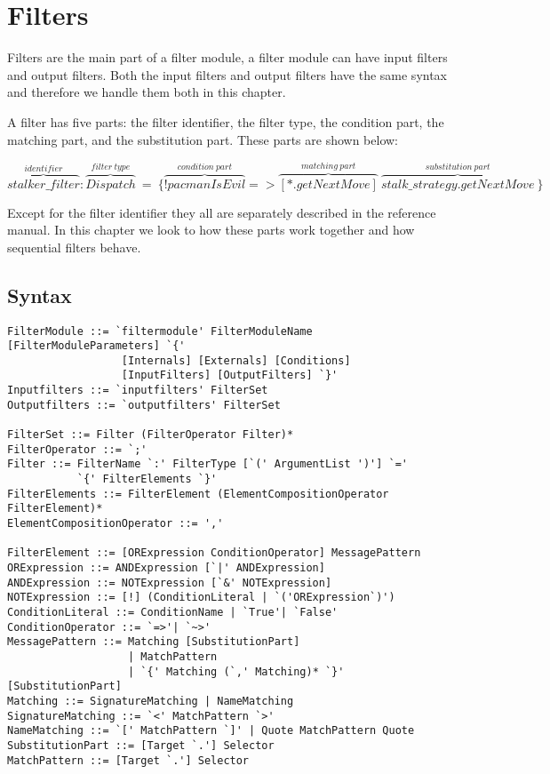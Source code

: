 \chapter{Filters} \label{chapter:filter}
Filters are the main part of a filter module, a filter module can have input filters and output filters.
Both the input filters and output filters have the same syntax and therefore we handle them both in this chapter.

A filter has five parts: the filter identifier, the filter type, the condition part, the matching part, and the substitution part. These parts are shown below:

\begin{center}
$\overbrace{stalker\_filter}^{identifier}:\overbrace{Dispatch}^{filter~type}~=~\{\overbrace{!pacmanIsEvil}^{condition~part}
=>\overbrace{[*.getNextMove]}^{matching~part}~\overbrace{stalk\_strategy.getNextMove}^{substitution~part}~\}$
\end{center}

Except for the filter identifier they all are separately described in the reference manual. In this chapter we look to how these parts work together and how sequential filters behave.

\section*{Syntax} %
\begin{lstlisting}[caption = {Filter syntax}, label = lst::ARM:fil:syntax,
style = listing, language = ebnf, float = tpb]
FilterModule ::= `filtermodule' FilterModuleName [FilterModuleParameters] `{'
                  [Internals] [Externals] [Conditions]
                  [InputFilters] [OutputFilters] `}'
Inputfilters ::= `inputfilters' FilterSet
Outputfilters ::= `outputfilters' FilterSet

FilterSet ::= Filter (FilterOperator Filter)*
FilterOperator ::= `;'
Filter ::= FilterName `:' FilterType [`(' ArgumentList ')'] `=' 
           `{' FilterElements `}'
FilterElements ::= FilterElement (ElementCompositionOperator FilterElement)*
ElementCompositionOperator ::= ','

FilterElement ::= [ORExpression ConditionOperator] MessagePattern
ORExpression ::= ANDExpression [`|' ANDExpression]
ANDExpression ::= NOTExpression [`&' NOTExpression]
NOTExpression ::= [!] (ConditionLiteral | `('ORExpression`)')
ConditionLiteral ::= ConditionName | `True'| `False'
ConditionOperator ::= `=>'| `~>'
MessagePattern ::= Matching [SubstitutionPart]
                   | MatchPattern
                   | `{' Matching (`,' Matching)* `}' [SubstitutionPart] 
Matching ::= SignatureMatching | NameMatching
SignatureMatching ::= `<' MatchPattern `>'
NameMatching ::= `[' MatchPattern `]' | Quote MatchPattern Quote
SubstitutionPart ::= [Target `.'] Selector
MatchPattern ::= [Target `.'] Selector
\end{lstlisting}

